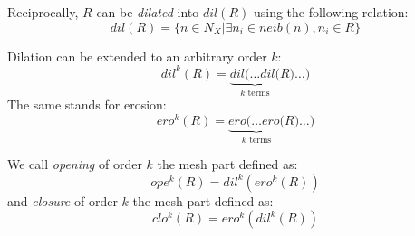 \documentclass[review]{acmsiggraph}
\begin{document}
Reciprocally, $R$ can be \emph{dilated} into $dil(R)$ using the following relation:
\begin{equation}
 dil(R) = \{ n \in N_X \vert \exists n_i \in neib(n), n_i \in R \}
\end{equation}

Dilation can be extended to an arbitrary order $k$:
\begin{equation}
 dil^k(R) = \underbrace{dil(\dots dil(}_{\text{$k$ terms}}R)\dots)
\end{equation}
The same stands for erosion:
\begin{equation}
 ero^k(R) = \underbrace{ero(\dots ero(}_{\text{$k$ terms}}R)\dots)
\end{equation}

We call \emph{opening} of order $k$ the mesh part defined as:
\begin{equation}
 ope^k(R) = dil^k(ero^k(R))
\end{equation}
and \emph{closure} of order $k$ the mesh part defined as:
\begin{equation}
 clo^k(R) = ero^k(dil^k(R))
\end{equation}
\end{document}
